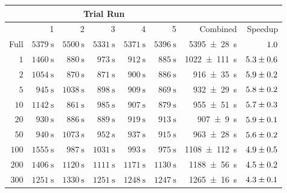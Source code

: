 \begin{table}[htbp]
	\centering
	\begin{tabular}{| r | r  r  r  r  r || r | r | }
		\cline{2-6} 
		\multicolumn{1}{c}{} & \multicolumn{5}{|c||}{Trial Run} \\ \hline
		\paramregions & 1 & 2 & 3 & 4 & 5 & Combined & Speedup \\
		
		\hline \hline
Full & $ \SI{5379}{\second} $ & $ \SI{5500}{\second} $ & $ \SI{5331}{\second} $ & $ \SI{5371}{\second} $ & $ \SI{5396}{\second} $ & \SI{5395 +- 28}{\second} & $ \num{1.0 +- 0.0} $ \\ 
		\hline

$ \num{1} $ & $ \SI{1460}{\second} $ & $ \SI{880}{\second} $ & $ \SI{973}{\second} $ & $ \SI{912}{\second} $ & $ \SI{885}{\second} $ & \SI{1022 +- 111}{\second} & $ \num{5.3 +- 0.6} $ \\ 
$ \num{2} $ & $ \SI{1054}{\second} $ & $ \SI{870}{\second} $ & $ \SI{871}{\second} $ & $ \SI{900}{\second} $ & $ \SI{886}{\second} $ & \SI{916 +- 35}{\second} & $ \num{5.9 +- 0.2} $ \\ 
$ \num{5} $ & $ \SI{945}{\second} $ & $ \SI{1038}{\second} $ & $ \SI{898}{\second} $ & $ \SI{909}{\second} $ & $ \SI{869}{\second} $ & \SI{932 +- 29}{\second} & $ \num{5.8 +- 0.2} $ \\ 
$ \num{10} $ & $ \SI{1142}{\second} $ & $ \SI{861}{\second} $ & $ \SI{985}{\second} $ & $ \SI{907}{\second} $ & $ \SI{879}{\second} $ & \SI{955 +- 51}{\second} & $ \num{5.7 +- 0.3} $ \\ 
$ \num{20} $ & $ \SI{930}{\second} $ & $ \SI{886}{\second} $ & $ \SI{889}{\second} $ & $ \SI{919}{\second} $ & $ \SI{913}{\second} $ & \SI{907 +- 9}{\second} & $ \num{5.9 +- 0.1} $ \\ 
$ \num{50} $ & $ \SI{940}{\second} $ & $ \SI{1073}{\second} $ & $ \SI{952}{\second} $ & $ \SI{937}{\second} $ & $ \SI{915}{\second} $ & \SI{963 +- 28}{\second} & $ \num{5.6 +- 0.2} $ \\ 
$ \num{100} $ & $ \SI{1555}{\second} $ & $ \SI{987}{\second} $ & $ \SI{1031}{\second} $ & $ \SI{993}{\second} $ & $ \SI{975}{\second} $ & \SI{1108 +- 112}{\second} & $ \num{4.9 +- 0.5} $ \\ 
$ \num{200} $ & $ \SI{1406}{\second} $ & $ \SI{1120}{\second} $ & $ \SI{1111}{\second} $ & $ \SI{1171}{\second} $ & $ \SI{1130}{\second} $ & \SI{1188 +- 56}{\second} & $ \num{4.5 +- 0.2} $ \\ 
$ \num{300} $ & $ \SI{1251}{\second} $ & $ \SI{1330}{\second} $ & $ \SI{1251}{\second} $ & $ \SI{1248}{\second} $ & $ \SI{1247}{\second} $ & \SI{1265 +- 16}{\second} & $ \num{4.3 +- 0.1} $ \\ 

\end{tabular}
\end{table}
